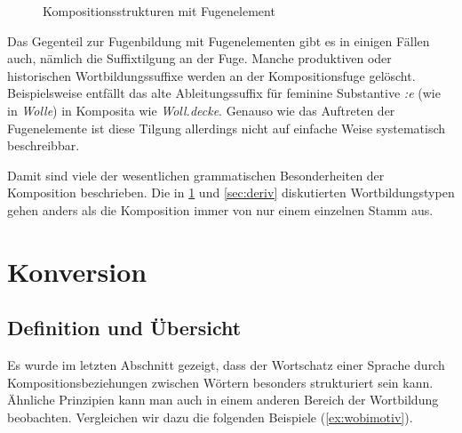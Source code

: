 \begin{figure}[!h]
  \centering
  \caption{Kompositionsstrukturen mit Fugenelement}
  \label{fig:kompfugstruk}
\end{figure}

Das Gegenteil zur Fugenbildung mit Fugenelementen gibt es in einigen Fällen auch, nämlich die Suffixtilgung an der Fuge.
Manche produktiven oder historischen Wortbildungssuffixe werden an der Kompositionsfuge gelöscht.
Beispielsweise entfällt das alte Ableitungssuffix für feminine Substantive \textit{:e} (wie in \textit{Wolle}) in Komposita wie \textit{Woll.decke}.
Genauso wie das Auftreten der Fugenelemente ist diese Tilgung allerdings nicht auf einfache Weise systematisch beschreibbar.

Damit sind viele der wesentlichen grammatischen Besonderheiten der Komposition beschrieben.
Die in \ref{sec:konv} und \ref{sec:deriv} diskutierten Wortbildungstypen gehen anders als die Komposition immer von nur einem einzelnen Stamm aus.

\section{Konversion}

\label{sec:konv}

\subsection{Definition und Übersicht}

\label{sec:konvdef}

Es wurde im letzten Abschnitt gezeigt, dass der Wortschatz einer Sprache durch Kompositionsbeziehungen zwischen Wörtern besonders strukturiert sein kann.
Ähnliche Prinzipien kann man auch in einem anderen Bereich der Wortbildung beobachten.
Vergleichen wir dazu die folgenden Beispiele (\ref{ex:wobimotiv}).

\begin{exe}
  \ex\label{ex:wobimotiv}
  \begin{xlist}
  \end{xlist}
\end{exe}

